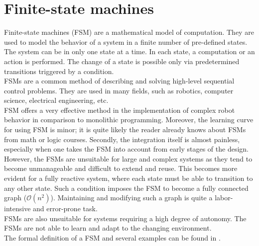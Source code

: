 \section{Finite-state machines}
    Finite-state machines (FSM) are a mathematical model of computation. They are used to model the behavior of a system in a finite number of pre-defined states. The system can be in only one state at a time. In each state, a computation or an action is performed. The change of a state is possible only via predetermined transitions triggered by a condition.\\
    FSMs are a common method of describing and solving high-level sequential control problems. They are used in many fields, such as robotics, computer science, electrical engineering, etc.\\
    FSM offers a very effective method in the implementation of complex robot behavior in comparison to monolithic programming.\cite{FSM_safety} Moreover, the learning curve for using FSM is minor; it is quite likely the reader already knows about FSMs from math or logic courses. Secondly, the integration itself is almost painless, especially when one takes the FSM into account from early stages of the design.\cite{FSM_intro}\\
    However, the FSMs are unsuitable for large and complex systems as they tend to become unmanageable and difficult to extend and reuse. This becomes more evident for a fully reactive system, where each state must be able to transition to any other state. Such a condition imposes the FSM to become a fully connected graph ($\mathcal{O}(n^2)$). Maintaining and modifying such a graph is quite a labor-intensive and error-prone task.\\
    FSMs are also unsuitable for systems requiring a high degree of autonomy. The FSMs are not able to learn and adapt to the changing environment.\\
    The formal definition of a FSM and several examples can be found in \cite{FSM_intro}.

